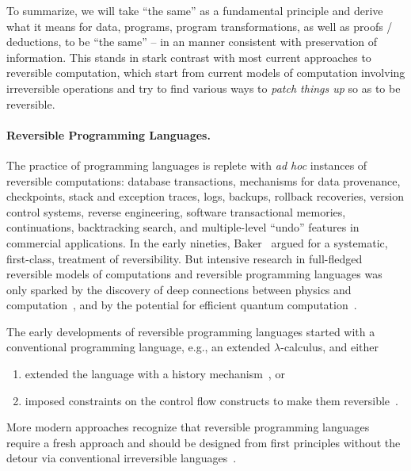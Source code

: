\documentclass{article}
\begin{document}
To summarize, we will take ``the same'' as a fundamental principle and
derive what it means for data, programs, program transformations, as
well as proofs / deductions, to be ``the same'' -- in an manner
consistent with preservation of information. This stands in stark
contrast with most current approaches to reversible computation, which
start from current models of computation involving irreversible
operations and try to find various ways to \emph{patch things up} so
as to be reversible.

\paragraph*{Reversible Programming Languages.} The practice of
programming languages is replete with \emph{ad hoc} instances of
reversible computations: database transactions, mechanisms for data
provenance, checkpoints, stack and exception traces, logs, backups,
rollback recoveries, version control systems, reverse engineering,
software transactional memories, continuations, backtracking search,
and multiple-level ``undo'' features in commercial applications. In
the early nineties, Baker~\cite{Baker:1992:LLL,Baker:1992:NFT} argued
for a systematic, first-class, treatment of reversibility. But
intensive research in full-fledged reversible models of computations
and reversible programming languages was only sparked by the discovery
of deep connections between physics and
computation~\cite{Landauer:1961,PhysRevA.32.3266,Toffoli:1980,bennett1985fundamental,Frank:1999:REC:930275},
and by the potential for efficient quantum
computation~\cite{springerlink:10.1007/BF02650179}.

The early developments of reversible programming languages started
with a conventional programming language, e.g., an extended
$\lambda$-calculus, and either
\begin{enumerate}
\item extended the language with a history
mechanism~\cite{vanTonder:2004,Kluge:1999:SEMCD,lorenz,danos2004reversible}, or
\item imposed constraints on the control flow constructs to make them
reversible~\cite{Yokoyama:2007:RPL:1244381.1244404}.
\end{enumerate}
More modern approaches recognize that reversible programming languages require
a fresh approach and should be designed from first principles without the
detour via conventional irreversible
languages~\cite{Yokoyama:2008:PRP,Mu:2004:ILRC,abramsky2005structural,DiPierro:2006:RCL:1166042.1166047}.
\end{document}
